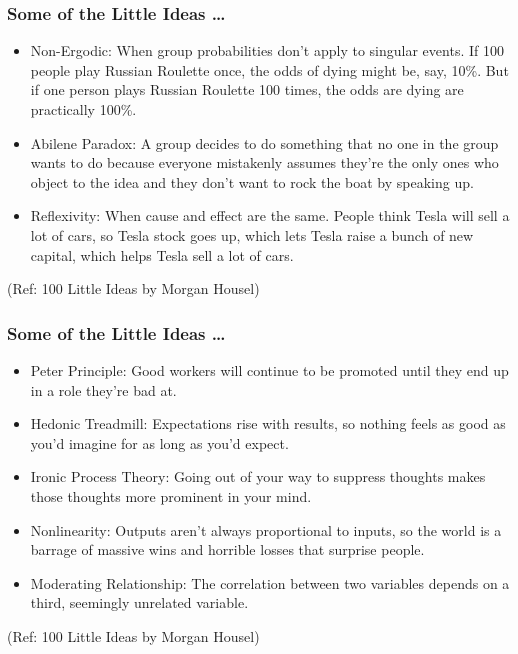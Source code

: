 \begin{frame}[fragile]\frametitle{ Some of the Little Ideas \ldots}

	\begin{itemize}
	\item Non-Ergodic: When group probabilities don’t apply to singular events. If 100 people play Russian Roulette once, the odds of dying might be, say, 10\%. But if one person plays Russian Roulette 100 times, the odds are dying are practically 100\%.
	\item Abilene Paradox: A group decides to do something that no one in the group wants to do because everyone mistakenly assumes they’re the only ones who object to the idea and they don’t want to rock the boat by speaking up.
	\item Reflexivity: When cause and effect are the same. People think Tesla will sell a lot of cars, so Tesla stock goes up, which lets Tesla raise a bunch of new capital, which helps Tesla sell a lot of cars.
	\end{itemize}

{\tiny (Ref: 100 Little Ideas by Morgan Housel)}

\end{frame}

\begin{frame}[fragile]\frametitle{ Some of the Little Ideas \ldots}

	\begin{itemize}
	\item Peter Principle: Good workers will continue to be promoted until they end up in a role they’re bad at.
	\item Hedonic Treadmill: Expectations rise with results, so nothing feels as good as you’d imagine for as long as you’d expect.
	\item Ironic Process Theory: Going out of your way to suppress thoughts makes those thoughts more prominent in your mind.
	\item Nonlinearity: Outputs aren’t always proportional to inputs, so the world is a barrage of massive wins and horrible losses that surprise people.
	\item Moderating Relationship: The correlation between two variables depends on a third, seemingly unrelated variable.
	\end{itemize}

{\tiny (Ref: 100 Little Ideas by Morgan Housel)}

\end{frame}


